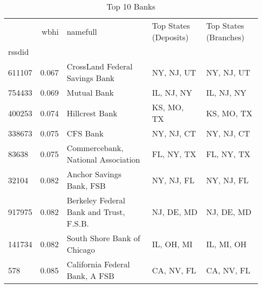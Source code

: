\begin{table}
\centering
\caption{Top 10 Banks}
\label{tab:bottom10}
\begin{tabular}{lrlll}
\toprule
{} &  wbhi &                                 namefull & Top States (Deposits) & Top States (Branches) \\
rssdid &       &                                          &                       &                       \\
\midrule
611107 & 0.067 &           CrossLand Federal Savings Bank &            NY, NJ, UT &            NY, NJ, UT \\
754433 & 0.069 &                              Mutual Bank &            IL, NJ, NY &            IL, NJ, NY \\
400253 & 0.074 &                           Hillcrest Bank &            KS, MO, TX &            KS, MO, TX \\
338673 & 0.075 &                                 CFS Bank &            NY, NJ, CT &            NY, NJ, CT \\
83638  & 0.075 &       Commercebank, National Association &            FL, NY, TX &            FL, NY, TX \\
32104  & 0.082 &                 Anchor Savings Bank, FSB &            NY, NJ, FL &            NY, NJ, FL \\
917975 & 0.082 &  Berkeley Federal Bank and Trust, F.S.B. &            NJ, DE, MD &            NJ, DE, MD \\
141734 & 0.082 &              South Shore Bank of Chicago &            IL, OH, MI &            IL, MI, OH \\
578    & 0.085 &           California Federal Bank, A FSB &            CA, NV, FL &            CA, NV, FL \\
\bottomrule
\end{tabular}
\end{table}
